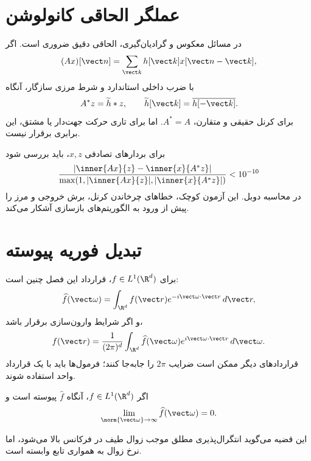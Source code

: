 \section{عملگر الحاقی کانولوشن}

در مسائل معکوس و گرادیان‌گیری، الحاقی دقیق ضروری است. اگر
\begin{equation}
(Ax)[\vect n]=\sum_{\vect k}h[\vect k]x[\vect n-\vect k],
\end{equation}
با ضرب داخلی استاندارد و شرط مرزی سازگار، آنگاه
\begin{equation}
A^*z=\widetilde h*z,
\qquad
\widetilde h[\vect k]=\overline{h[-\vect k]}.
\label{eq:conv-adjoint}
\end{equation}
برای کرنل حقیقی و متقارن، \(A^*=A\). اما برای تاری حرکت جهت‌دار یا مشتق، این برابری برقرار نیست.

\begin{workshopbox}
برای بردارهای تصادفی \(x,z\)، باید بررسی شود
\begin{equation}
\frac{|\inner{Ax}{z}-\inner{x}{A^*z}|}
{\max(1,|\inner{Ax}{z}|,|\inner{x}{A^*z}|)}<10^{-10}
\end{equation}
در محاسبه دوبل. این آزمون کوچک، خطاهای چرخاندن کرنل، برش خروجی و مرز را پیش از ورود به الگوریتم‌های
بازسازی آشکار می‌کند.
\end{workshopbox}

\section{تبدیل فوریه پیوسته}

برای \(f\in L^1(\R^d)\)، قرارداد این فصل چنین است:
\begin{equation}
\widehat f(\vect\omega)=\int_{\R^d}f(\vect r)e^{-i\vect\omega\cdot\vect r}\,d\vect r,
\label{eq:ctft}
\end{equation}
و اگر شرایط وارون‌سازی برقرار باشد،
\begin{equation}
f(\vect r)=\frac{1}{(2\pi)^d}\int_{\R^d}\widehat f(\vect\omega)
 e^{i\vect\omega\cdot\vect r}\,d\vect\omega.
\label{eq:ictft}
\end{equation}
قراردادهای دیگر ممکن است ضرایب \(2\pi\) را جابه‌جا کنند؛ فرمول‌ها باید با یک قرارداد واحد استفاده شوند.

\begin{theorem}
اگر \(f\in L^1(\R^d)\)، آنگاه \(\widehat f\) پیوسته است و
\begin{equation}
\lim_{\norm{\vect\omega}\to\infty}\widehat f(\vect\omega)=0.
\end{equation}
\end{theorem}
این قضیه می‌گوید انتگرال‌پذیری مطلق موجب زوال طیف در فرکانس بالا می‌شود، اما نرخ زوال به همواری تابع وابسته است.

